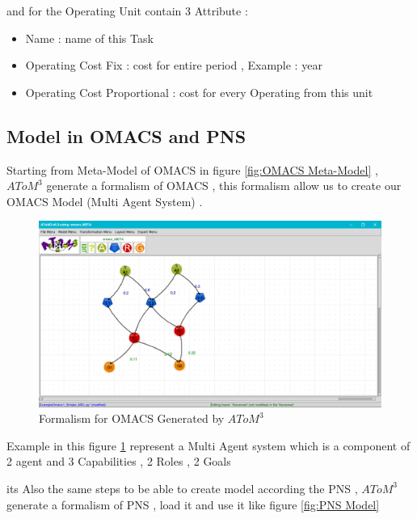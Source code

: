 and for the Operating Unit contain 3 Attribute : 
\begin{itemize}

\item Name : name of this Task 
\item Operating Cost Fix  : cost for entire period ,  Example : year
\item Operating Cost Proportional  :  cost for every Operating from this unit

\end{itemize}

\pagebreak

\subsection{ Model in OMACS and PNS }

Starting from  Meta-Model of OMACS in figure  \ref{fig:OMACS Meta-Model}  , $AToM^3$ generate a formalism of OMACS  , this formalism allow us to create our OMACS Model (Multi Agent System) .
\vspace{0.1cm}
\begin{figure}[th]
	\centering
 	\includegraphics[scale=0.3]{Chapiter3/img/omacs_model}
	\caption{\label{fig:OMACS Model}Formalism for OMACS Generated by $AToM^3$ }
\end{figure} 

Example in this figure \ref{fig:OMACS Model} represent a Multi Agent system which is  a component of 2 agent and 3 Capabilities , 2 Roles , 2 Goals
\vspace{0.1cm}


its Also the same steps to be able to create model according the PNS , $AToM^3$ generate a formalism of PNS , load it and use it like figure \ref{fig:PNS Model}

